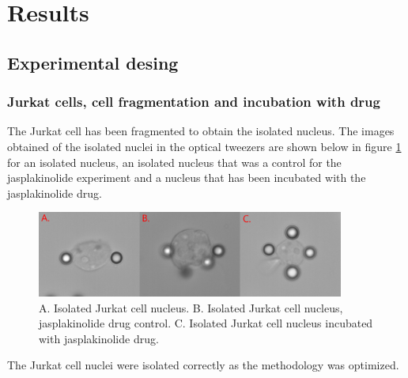 \documentclass[12pt, a4paper]{article} %
\begin{document}
	
	\section{Results}
	
	\subsection{Experimental desing}
	
	\subsubsection{Jurkat cells, cell fragmentation and incubation with drug}
	
	The Jurkat cell has been fragmented to obtain the isolated nucleus. The images obtained of the isolated nuclei in the optical tweezers are shown below in figure \ref{fig:jurkat_cells} for an isolated nucleus, an isolated nucleus that was a control for the jasplakinolide experiment and a nucleus that has been incubated with the jasplakinolide drug.
	
	\setlength{\parskip}{4mm}
	
	\begin{figure}[htbp]
		\centering
		\includegraphics[width=0.9\textwidth]{figures/jurkat_cell_shape.png}
		\caption{A. Isolated Jurkat cell nucleus. B. Isolated Jurkat cell nucleus, jasplakinolide drug control. C. Isolated Jurkat cell nucleus incubated with jasplakinolide drug.}
		\label{fig:jurkat_cells}
	\end{figure}
	
	The Jurkat cell nuclei were isolated correctly as the methodology was optimized.
	
\end{document}
